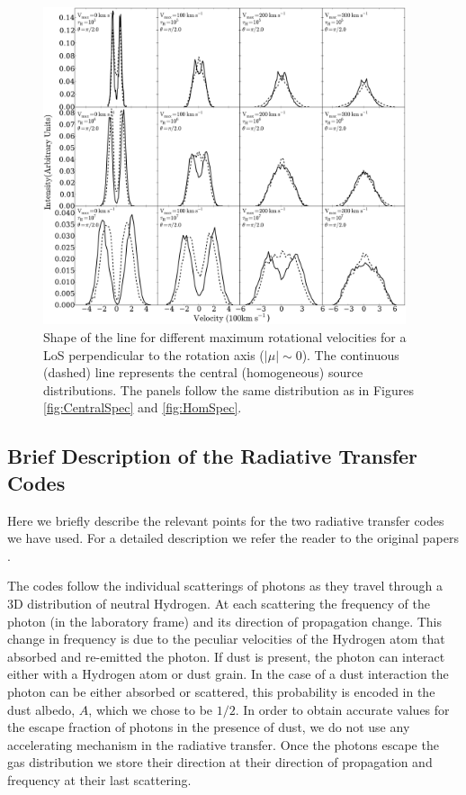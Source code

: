 \documentclass{emulateapj}
\newcommand{\ly}{{\ifmmode{{\rm Ly}\alpha~}\else{Ly$\alpha$~}\fi}}
\begin{document}
\begin{figure}
\begin{center}
  \includegraphics[width=0.95\textwidth]{f4.pdf}
\end{center}
\caption{Shape of the \ly line for different maximum rotational
  velocities for a LoS perpendicular to the rotation axis
  ($|\mu|\sim 0$). The continuous (dashed) line represents the central
  (homogeneous) source distributions.  The panels follow the same
  distribution as in Figures \ref{fig:CentralSpec} and \ref{fig:HomSpec}.
    \label{fig:differentvelocities}}  
\end{figure}


\subsection{Brief Description of the Radiative Transfer Codes}

Here we briefly describe the relevant points for the two radiative
transfer codes we have used. For a detailed description we refer the
reader to the original papers \cite{CLARA,DijkstraKramer}.

The codes follow the individual scatterings of \ly photons as they
travel through a 3D distribution of neutral Hydrogen. At each
scattering the frequency of the photon (in the laboratory frame) and
its direction of propagation change. This change in frequency is due
to the peculiar velocities of the Hydrogen atom that absorbed and
re-emitted the photon. If dust is present, the photon can interact
either with a Hydrogen atom or dust grain. In the case of a dust
interaction the photon can be either absorbed or scattered, this
probability is encoded in the dust albedo, $A$, which we chose to be
$1/2$. In order to obtain accurate values for the escape fraction of
photons in the presence of dust, we do not use any accelerating
mechanism in the radiative transfer. Once the photons escape the gas
distribution we store their direction at their direction of
propagation and frequency at their last scattering.
\end{document}
